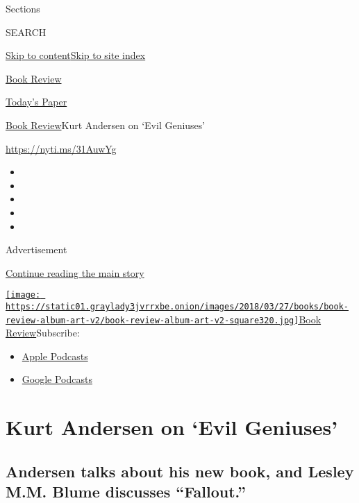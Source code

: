 Sections

SEARCH

\protect\hyperlink{site-content}{Skip to
content}\protect\hyperlink{site-index}{Skip to site index}

\href{https://www.nytimes3xbfgragh.onion/section/books/review}{Book
Review}

\href{https://myaccount.nytimes3xbfgragh.onion/auth/login?response_type=cookie\&client_id=vi}{}

\href{https://www.nytimes3xbfgragh.onion/section/todayspaper}{Today's
Paper}

\href{/section/books/review}{Book Review}\textbar{}Kurt Andersen on
`Evil Geniuses'

\url{https://nyti.ms/31AuwYg}

\begin{itemize}
\item
\item
\item
\item
\item
\end{itemize}

Advertisement

\protect\hyperlink{after-top}{Continue reading the main story}

\href{https://www.nytimes3xbfgragh.onion/column/book-review-podcast}{\texttt{[image: https://static01.graylady3jvrrxbe.onion/images/2018/03/27/books/book-review-album-art-v2/book-review-album-art-v2-square320.jpg]}Book
Review}Subscribe:

\begin{itemize}
\tightlist
\item
  \href{https://itunes.apple.com/us/podcast/id120315179}{Apple Podcasts}
\item
  \href{https://www.google.com/podcasts?feed=aHR0cHM6Ly9yc3MuYXJ0MTkuY29tL2Jvb2stcmV2aWV3}{Google
  Podcasts}
\end{itemize}

\hypertarget{kurt-andersen-on-evil-geniuses}{%
\section{Kurt Andersen on `Evil
Geniuses'}\label{kurt-andersen-on-evil-geniuses}}

\hypertarget{andersen-talks-about-his-new-book-and-lesley-mm-blume-discusses-fallout}{%
\subsection{Andersen talks about his new book, and Lesley M.M. Blume
discusses
``Fallout.''}\label{andersen-talks-about-his-new-book-and-lesley-mm-blume-discusses-fallout}}


